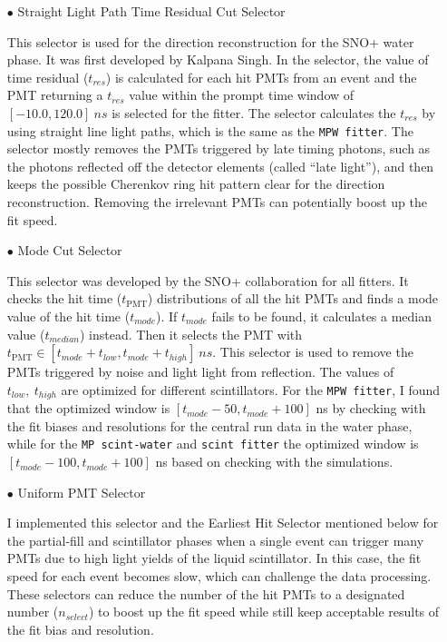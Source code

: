 \begin{itemize}
	\item[$\bullet$] Straight Light Path Time Residual Cut Selector
	
	This selector is used for the direction reconstruction for the SNO+ water phase. It was first developed by Kalpana Singh\cite{kalpanaMPFitter}. In the selector, the value of time residual ($t_{res}$) is calculated for each hit PMTs from an event and the PMT returning a $t_{res}$ value within the prompt time window of $[-10.0, 120.0]~ns$ is selected for the fitter. The selector calculates the $t_{res}$ by using straight line light paths, which is the same as the \texttt{MPW fitter}. The selector mostly removes the PMTs triggered by late timing photons, such as the photons reflected off the detector elements (called ``late light''), and then keeps the possible Cherenkov ring hit pattern clear for the direction reconstruction. Removing the irrelevant PMTs can potentially boost up the fit speed.
	
	\item[$\bullet$] Mode Cut Selector
	
	This selector was developed by the SNO+ collaboration for all fitters. It checks the hit time ($t_\mathrm{PMT}$) distributions of all the hit PMTs and finds a mode value of the hit time ($t_{mode}$). If $t_{mode}$ fails to be found, it calculates a median value ($t_{median}$) instead\cite{modeCut}. Then it selects the PMT with $t_\mathrm{PMT} \in [t_{mode}+t_{low}, t_{mode}+t_{high}]~ns$. This selector is used to remove the　PMTs triggered by noise and light light from reflection. The values of $t_{low},~t_{high}$ are optimized for different scintillators. For the \texttt{MPW fitter}, I found that the optimized window is $[t_{mode}-50, t_{mode}+100]$ ns by checking with the fit biases and resolutions for the  central run data in the water phase, while for the \texttt{MP scint-water} and \texttt{scint fitter} the optimized window is $[t_{mode}-100, t_{mode}+100]$ ns based on checking with the simulations.
	
	\item[$\bullet$] Uniform PMT Selector
	
	I implemented this selector and the Earliest Hit Selector mentioned below for the partial-fill and scintillator phases when a single event can trigger many PMTs due to high light yields of the liquid scintillator. In this case, the fit speed for each event becomes slow, which can challenge the data processing. These selectors can reduce the number of the hit PMTs to a designated number ($n_{select}$) to boost up the fit speed while still keep acceptable results of the fit bias and resolution. 
	

\end{itemize}

